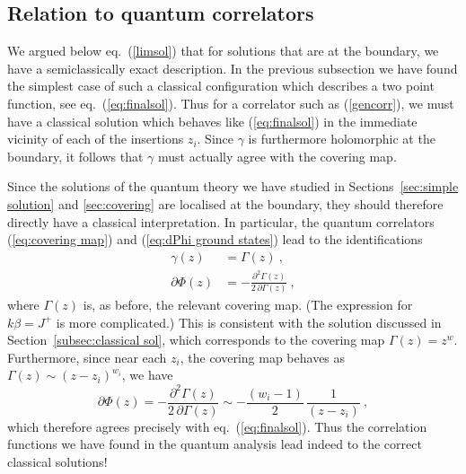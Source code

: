 \documentclass[12pt,a4paper]{article}
\newcommand{\be}{\begin{equation}}
\newcommand{\ee}{\end{equation}}
\begin{document}
\subsection{Relation to quantum correlators}\label{sec:classquant}

We argued below eq.~(\ref{limsol}) that for solutions  that are at the boundary, we have a semiclassically exact description. In the previous subsection we have found the simplest case of such a classical configuration which describes a two point function, see  eq.~(\ref{eq:finalsol}).
Thus for a correlator such as (\ref{gencorr}), we must have a classical solution which behaves like (\ref{eq:finalsol}) in the immediate vicinity of each of the insertions $z_i$. Since $\gamma$ is furthermore holomorphic at the boundary, it follows that $\gamma$ must actually agree with the covering map.

Since the solutions of the quantum theory we have studied in Sections~\ref{sec:simple solution} and \ref{sec:covering} are localised at the boundary, they should therefore directly have a classical interpretation. In particular, the quantum correlators (\ref{eq:covering map}) and (\ref{eq:dPhi ground states}) lead to the identifications  
\begin{align}\label{classcov}
\gamma(z)&=\Gamma(z)\ , \\
\partial \Phi(z)&= -\frac{\partial^2 \Gamma(z)}{2\,\partial \Gamma(z)}\ , \label{eq:LMformula}
\end{align} 
where $\Gamma(z)$ is, as before, the relevant covering map. (The expression for $k \beta = J^+$ is more complicated.) 
This is consistent with the solution discussed in Section~\ref{subsec:classical sol}, which corresponds to the covering map $\Gamma(z)=z^w$. Furthermore, since near each $z_i$, the covering map behaves as $\Gamma(z) \sim (z-z_i)^{w_i}$, we have
\be
\partial \Phi(z) = -\frac{\partial^2 \Gamma(z)}{2\,\partial \Gamma(z)} \sim - \frac{(w_i-1)}{2} \, \frac{1}{(z-z_i)} \ , 
\ee
which therefore agrees precisely with eq.~(\ref{eq:finalsol}). Thus the correlation functions we have found in the quantum analysis lead indeed to the correct classical solutions!
\smallskip
\end{document}
